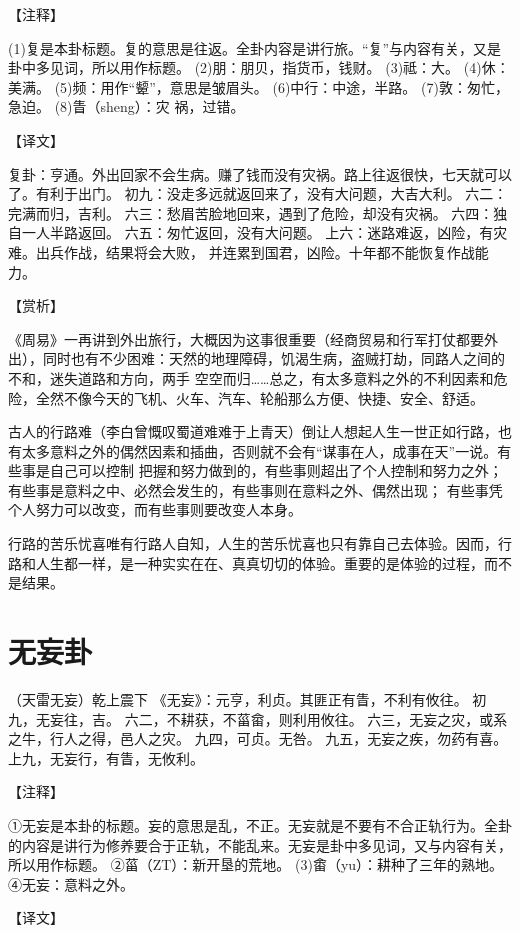 \documentclass[12pt,UTF8]{ctexbook}
\begin{document}
【注释】

(1)复是本卦标题。复的意思是往返。全卦内容是讲行旅。“复”与内容有关，又是卦中多见词，所以用作标题。
(2)朋：朋贝，指货币，钱财。
(3)祗：大。
(4)休：美满。
(5)频：用作“颦”，意思是皱眉头。
(6)中行：中途，半路。
(7)敦：匆忙，急迫。
(8)眚（sheng）：灾 祸，过错。

【译文】

复卦：亨通。外出回家不会生病。赚了钱而没有灾祸。路上往返很快，七天就可以了。有利于出门。
初九：没走多远就返回来了，没有大问题，大吉大利。
六二：完满而归，吉利。
六三：愁眉苦脸地回来，遇到了危险，却没有灾祸。
六四：独自一人半路返回。
六五：匆忙返回，没有大问题。
上六：迷路难返，凶险，有灾难。出兵作战，结果将会大败， 并连累到国君，凶险。十年都不能恢复作战能力。

【赏析】

《周易》一再讲到外出旅行，大概因为这事很重要（经商贸易和行军打仗都要外出），同时也有不少困难：天然的地理障碍，饥渴生病，盗贼打劫，同路人之间的不和，迷失道路和方向，两手 空空而归……总之，有太多意料之外的不利因素和危险，全然不像今天的飞机、火车、汽车、轮船那么方便、快捷、安全、舒适。

古人的行路难（李白曾慨叹蜀道难难于上青天）倒让人想起人生一世正如行路，也有太多意料之外的偶然因素和插曲，否则就不会有“谋事在人，成事在天”一说。有些事是自己可以控制 把握和努力做到的，有些事则超出了个人控制和努力之外；有些事是意料之中、必然会发生的，有些事则在意料之外、偶然出现； 有些事凭个人努力可以改变，而有些事则要改变人本身。

行路的苦乐忧喜唯有行路人自知，人生的苦乐忧喜也只有靠自己去体验。因而，行路和人生都一样，是一种实实在在、真真切切的体验。重要的是体验的过程，而不是结果。

\chapter{无妄卦}

（天雷无妄）乾上震下
《无妄》：元亨，利贞。其匪正有眚，不利有攸往。
初九，无妄往，吉。
六二，不耕获，不菑畲，则利用攸往。
六三，无妄之灾，或系之牛，行人之得，邑人之灾。
九四，可贞。无咎。
九五，无妄之疾，勿药有喜。
上九，无妄行，有眚，无攸利。

【注释】

①无妄是本卦的标题。妄的意思是乱，不正。无妄就是不要有不合正轨行为。全卦的内容是讲行为修养要合于正轨，不能乱来。无妄是卦中多见词，又与内容有关，所以用作标题。
②菑（ZT）：新开垦的荒地。
(3)畬（yu）：耕种了三年的熟地。
④无妄：意料之外。

【译文】
\end{document}
